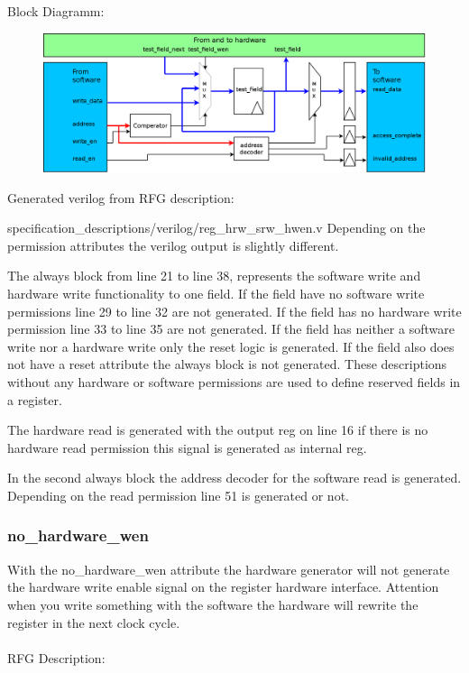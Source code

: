 \documentclass[12pt,a4paper]{article}
\begin{document}
Block Diagramm:
\begin{figure}[h!]
\includegraphics[width=\textwidth]{pictures/Reg_hrw_srw_hwen.png}
\end{figure}
\newpage
Generated verilog from RFG description:

{specification_descriptions/verilog/reg_hrw_srw_hwen.v}
Depending on the permission attributes the verilog output is slightly different. 

The always block from line 21 to line 38, represents the software write and hardware write functionality to one field. If the field have no software write permissions line 29 to line 32 are not generated. If the field has no hardware write permission line 33 to line 35 are not generated. If the field has neither a software write nor a hardware write only the reset logic is generated. If the field also does not have a reset attribute the always block is not generated. These descriptions without any hardware or software permissions are used to define reserved fields in a register.

The hardware read is generated with the output reg on line 16 if there is no hardware read permission this signal is generated as internal reg.

In the second always block the address decoder for the software read is generated. Depending on the read permission line 51 is generated or not.

\newpage

\subsubsection{no\_hardware\_wen}

With the no\_hardware\_wen attribute the hardware generator will not generate the hardware write enable signal on the register hardware interface. Attention when you write something with the software the hardware will rewrite the register in the next clock cycle.\\
\\
RFG Description:

\end{document}
